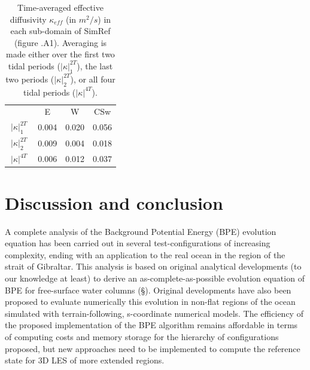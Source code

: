 \begin{table}[h]
    \centering
    \begin{tabular}{|c|c|c|c|}
          \hline
         & E & W & CSw \\
         \cline{2-4}
         $\: |\kappa|^{2T}_1\;$ & 0.004 & 0.020 & 0.056\\
         $\: |\kappa|^{2T}_2 \;$ & 0.009 & 0.004 & 0.018\\
         $\: |\kappa|^{4T} \;$ & 0.006 & 0.012 & 0.037\\
         \hline
    \end{tabular}
    \caption[Time-averaged effective diffusivity $\kappa_{eff}$ in SimRef.]{Time-averaged effective diffusivity $\kappa_{eff}$ (in $m^2/s$) in each sub-domain of SimRef (figure .A1). Averaging is made either over the first two tidal periods ($|\kappa |^{2T}_1$), the last two periods ($|\kappa |^{2T}_2$), or all four tidal periods ($|\kappa |^{4T}$).}
    \label{tab_kappaTCS}
\end{table}

\section{Discussion and conclusion}
A complete analysis of the Background Potential Energy (BPE) evolution equation has been carried out in several test-configurations of increasing complexity, ending with an application to the real ocean in the region of the strait of Gibraltar. This analysis is based on original analytical developments (to our knowledge at least) to derive an as-complete-as-possible evolution equation of BPE for free-surface water columns (\S {}). Original developments have also been proposed to evaluate numerically this evolution in non-flat regions of the ocean simulated with terrain-following, s-coordinate numerical models. The efficiency of the proposed implementation of the BPE algorithm remains affordable in terms of computing costs and memory storage for the hierarchy of configurations proposed, but new approaches need to be implemented to compute the reference state \citep{saenz_estimating_2015} for 3D LES of more extended regions.


